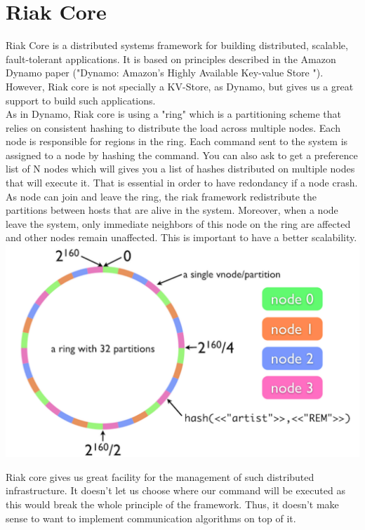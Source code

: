\documentclass[a4paper, 11pt]{article}
\begin{document}
\section{Riak Core}

Riak Core is a distributed systems framework for building distributed, scalable, fault-tolerant applications. It is based on principles described in the Amazon Dynamo paper ("Dynamo: Amazon’s Highly Available Key-value Store "). However, Riak core is not specially a KV-Store, as Dynamo, but gives us a great support to build such applications. \\

As in Dynamo, Riak core is using a "ring" which is a partitioning scheme that relies on consistent hashing to distribute the load across multiple nodes. Each node is responsible for regions in the ring. Each command sent to the system is assigned to a node by hashing the command. You can also ask to get a preference list of N nodes which will gives you a list of hashes distributed on multiple nodes that will execute it. That is essential in order to have redondancy if a node crash. As node can join and leave the ring, the riak framework redistribute the partitions between hosts that are alive in the system. Moreover, when a node leave the system, only immediate neighbors of this node on the ring are affected and other nodes remain unaffected. This is important to have a better scalability.\\

\includegraphics[width=\linewidth]{ring.png}

Riak core gives us great facility for the management of such distributed infrastructure. It doesn't let us choose where our command will be executed as this would break the whole principle of the framework. Thus, it doesn't make sense to want to implement communication algorithms on top of it. \\
\end{document}
